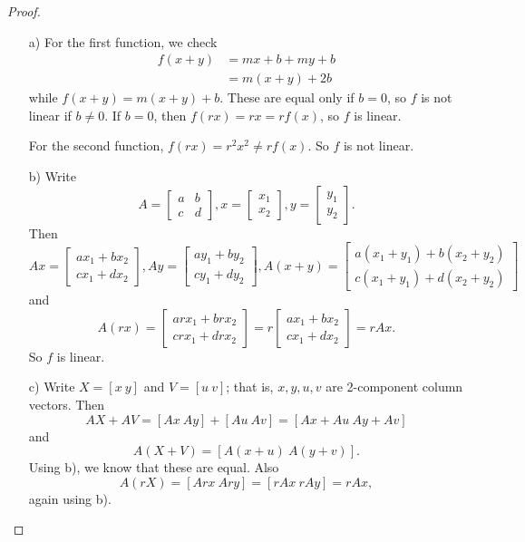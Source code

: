 \documentclass{article}
\theoremstyle{definition}
\begin{document}
\begin{proof}\ 
	\begin{itemize}
		\item [a)] For the first function, we check 
		\begin{align*}
			f(x+y)&= mx +b + m y + b\\
			&= m(x+y) + 2b
		\end{align*}
	while $f(x+y)=m(x+y)+b$. These are equal only if $b=0$, so $f$ is not linear if $b \neq 0$.
	If $b=0$, then $f(rx)=rx=rf(x)$, so $f$ is linear. 
	
	For the second function, $f(rx)=r^2 x^2 \neq r f(x)$. So $f$ is not linear.
	\item [b)] Write 
	\[A=\begin{bmatrix}
		a & b\\
		c & d
	\end{bmatrix}, x=\begin{bmatrix}
	x_1\\x_2
\end{bmatrix}, y=\begin{bmatrix}
y_1\\y_2
\end{bmatrix}.\]
Then 
\[Ax=\begin{bmatrix}
	a x_1 + b x_2 \\c x_1 + dx_2
\end{bmatrix}, Ay=\begin{bmatrix}
a y_1 + b y_2 \\c y_1 + dy_2
\end{bmatrix}, A(x+y)=\begin{bmatrix}
a (x_1+y_1 )+ b (x_2+ y_2) \\c (x_1 + y_1) + d(x_2+y_2)
\end{bmatrix}\] and 
\[A (rx)= \begin{bmatrix}
	a r x_1 + b r x_2 \\c r x_1 + d r x_2
\end{bmatrix}= r \begin{bmatrix}
a x_1 + b x_2 \\c x_1 + dx_2
\end{bmatrix} = rAx.\]
So $f$ is linear.
\item [c)] Write $X=[x ~ y]$ and $V=[u~ v]$; that is, $x, y, u, v$ are 2-component column vectors. Then 
\[AX + AV=[Ax ~ Ay]+[Au~Av]=[Ax+Au ~ Ay+ Av] \]
and 
\[ A(X + V)=[A(x+u)~A(y+v)].\]
Using b), we know that these are equal. Also 
\[A(rX)=[Arx~Ary]=[rAx~ rAy]=rAx,\]
again using b).
	\end{itemize}
\end{proof}
\end{document}
